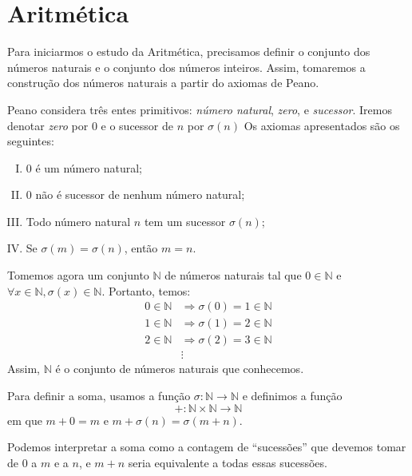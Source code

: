 \chapter{Aritmética}
Para iniciarmos o estudo da Aritmética, precisamos definir o conjunto dos números naturais e o conjunto dos números inteiros. Assim, tomaremos a construção dos números naturais a partir do axiomas de Peano. \par 
Peano considera três entes primitivos: \emph{número natural}, \emph{zero}, e \emph{sucessor}. Iremos denotar \emph{zero} por $0$ e o sucessor de $n$ por $\sigma(n)$ Os axiomas apresentados são os seguintes: \begin{enumerate}[I.]
\item $0$ é um número natural;
\item $0$ não é sucessor de nenhum número natural;
\item Todo número natural $n$ tem um sucessor $\sigma(n)$;
\item Se $\sigma(m)=\sigma(n)$, então $m=n$.
\end{enumerate}
Tomemos agora um conjunto $\mathbb{N}$ de números naturais tal que $0\in \mathbb{N}$ e $\forall x \in \mathbb{N}, \sigma(x) \in \mathbb{N}$. Portanto, temos:
\begin{align*}
0 \in \mathbb{N} &\Rightarrow \sigma(0)=1 \in \mathbb{N} \\
1 \in \mathbb{N} &\Rightarrow \sigma(1)=2 \in \mathbb{N} \\
2 \in \mathbb{N} &\Rightarrow \sigma(2)=3 \in \mathbb{N} \\
&\vdots 
\end{align*}
Assim, $\mathbb{N}$ é o conjunto de números naturais que conhecemos. \par
Para definir a soma, usamos a função $\sigma: \mathbb{N} \rightarrow \mathbb{N}$ e definimos a função \[+ : \mathbb{N}\times\mathbb{N} \rightarrow \mathbb{N}\] em que $m+0=m$ e $m+\sigma(n)=\sigma(m+n)$.\par 
Podemos interpretar a soma como a contagem de ``sucessões'' que devemos tomar de $0$ a $m$ e a $n$, e $m+n$ seria equivalente a todas essas sucessões.

